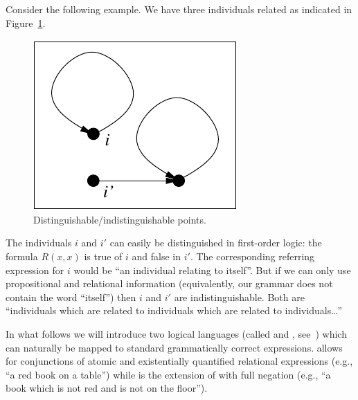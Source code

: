 Consider the following example.  We have three individuals related as indicated in
Figure~\ref{fig-car1}.
\begin{figure}
\begin{center}
\includegraphics[scale=.8]{pic.pdf}
\end{center}
\caption{Distinguishable/indistinguishable points.}\label{fig-car1}
\end{figure}
%
The individuals $i$ and $i'$ can easily be distinguished in first-order logic:
the formula $R(x,x)$ is true of $i$ and false in $i'$. The corresponding
referring expression for $i$ would be ``an individual relating to itself''.
But if we can only use propositional and relational information (equivalently, our grammar does not contain the word ``itself'') then $i$ and $i'$ are indistinguishable. Both
are ``individuals which are related to individuals which are related to individuals\ldots''

In what follows we will introduce two logical languages (called \el and \alc, see~\cite{baad:desc03}) which can naturally be mapped to standard grammatically correct expressions.  \el allows
for conjunctions of atomic and existentially quantified relational expressions (e.g.,
``a red book on a table'') while \alc is the extension of \el with full negation
(e.g., ``a book which is not red and is not on the floor'').

